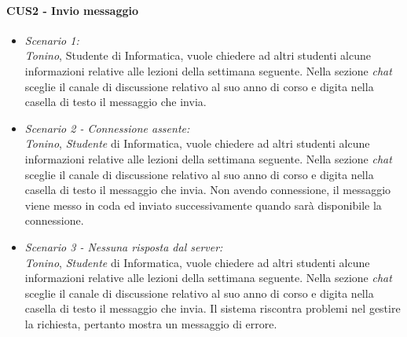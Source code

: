 \paragraph{CUS2 - Invio messaggio\\}
\begin{itemize}
	
	\item \textit{Scenario 1:\\}
	\textit{Tonino}, {Studente} di Informatica, vuole chiedere ad altri studenti alcune informazioni relative alle lezioni della settimana seguente. Nella sezione \textit{chat} sceglie il canale di discussione relativo al suo anno di corso e digita nella casella di testo il messaggio che invia.\\
	
	\item \textit{Scenario 2 - Connessione assente:\\}
	\textit{Tonino}, \textit{Studente} di Informatica, vuole chiedere ad altri studenti alcune informazioni relative alle lezioni della settimana seguente. Nella sezione \textit{chat} sceglie il canale di discussione relativo al suo anno di corso e digita nella casella di testo il messaggio che invia. Non avendo connessione, il messaggio viene messo in coda ed inviato successivamente quando sarà disponibile la connessione.\\
	
	\item \textit{Scenario 3 - Nessuna risposta dal server:\\}
	\textit{Tonino}, \textit{Studente} di Informatica, vuole chiedere ad altri studenti alcune informazioni relative alle lezioni della settimana seguente. Nella sezione \textit{chat} sceglie il canale di discussione relativo al suo anno di corso e digita nella casella di testo il messaggio che invia. Il sistema riscontra problemi nel gestire la richiesta, pertanto mostra un messaggio di errore.\\
\end{itemize}


